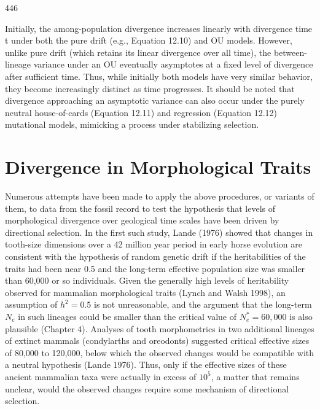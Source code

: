 \documentclass{article}
\begin{document}
446

Initially, the among-population divergence increases linearly with divergence time t under both the pure drift (e.g., Equation 12.10) and OU models. However, unlike pure drift (which retains its linear divergence over all time), the between-lineage variance under an OU eventually asymptotes at a fixed level of divergence after sufficient time. Thus, while initially both models have very similar behavior, they become increasingly distinct as time progresses. It should be noted that divergence approaching an asymptotic variance can also occur under the purely neutral house-of-cards (Equation 12.11) and regression (Equation 12.12) mutational models, mimicking a process under stabilizing selection.

\section{Divergence in Morphological Traits}
Numerous attempts have been made to apply the above procedures, or variants of them, to data from the fossil record to test the hypothesis that levels of morphological divergence over geological time scales have been driven by directional selection. In the first such study, Lande (1976) showed that changes in tooth-size dimensions over a 42 million year period in early horse evolution are consistent with the hypothesis of random genetic drift if the heritabilities of the traits had been near 0.5 and the long-term effective population size was smaller than 60,000 or so individuals. Given the generally high levels of heritability observed for mammalian morphological traits (Lynch and Walsh 1998), an assumption of  $ h^{2} = 0.5 $ is not unreasonable, and the argument that the long-term  $ N_{e} $ in such lineages could be smaller than the critical value of  $ N_{e}^{*} = 60,000 $ is also plausible (Chapter 4). Analyses of tooth morphometrics in two additional lineages of extinct mammals (condylarths and oreodonts) suggested critical effective sizes of 80,000 to 120,000, below which the observed changes would be compatible with a neutral hypothesis (Lande 1976). Thus, only if the effective sizes of these ancient mammalian taxa were actually in excess of  $ 10^{5} $, a matter that remains unclear, would the observed changes require some mechanism of directional selection.
\end{document}
